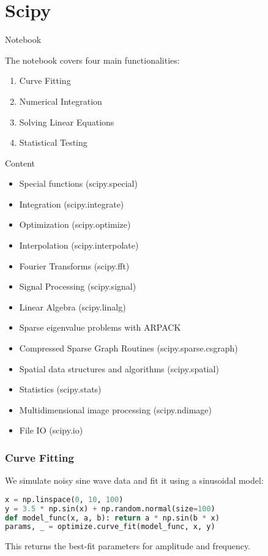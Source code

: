 \section{Scipy}

\begin{frame}[plain]
\sectionpage
\end{frame}


\begin{frame}{Notebook}

The notebook covers four main functionalities:
\begin{enumerate}
    \item Curve Fitting
    \item Numerical Integration
    \item Solving Linear Equations
    \item Statistical Testing
\end{enumerate}
\end{frame}

\begin{frame}[allowframebreaks]{Content}
\begin{itemize}
\item Special functions (scipy.special)
\item Integration (scipy.integrate)
\item Optimization (scipy.optimize)
\item Interpolation (scipy.interpolate)
\item Fourier Transforms (scipy.fft)
\item Signal Processing (scipy.signal)
\item Linear Algebra (scipy.linalg)
\item Sparse eigenvalue problems with ARPACK
\item Compressed Sparse Graph Routines (scipy.sparse.csgraph)
\item Spatial data structures and algorithms (scipy.spatial)
\item Statistics (scipy.stats)
\item Multidimensional image processing (scipy.ndimage)
\item File IO (scipy.io)
\end{itemize}
\end{frame}



\begin{frame}[fragile]
\frametitle{Curve Fitting}
We simulate noisy sine wave data and fit it using a sinusoidal model:

\begin{lstlisting}[language=python]
x = np.linspace(0, 10, 100)
y = 3.5 * np.sin(x) + np.random.normal(size=100)
def model_func(x, a, b): return a * np.sin(b * x)
params, _ = optimize.curve_fit(model_func, x, y)
\end{lstlisting}


This returns the best-fit parameters for amplitude and frequency.
\end{frame}


